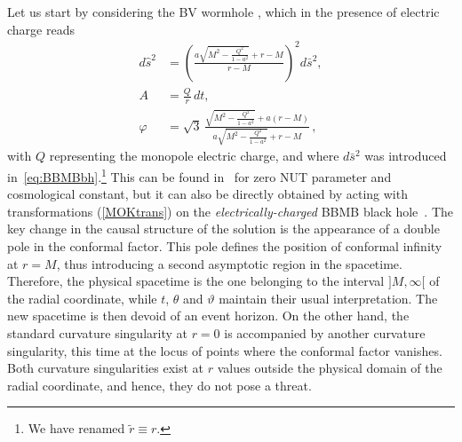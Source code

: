 \documentclass[aps,preprint,groupedaddress,nofootinbib,superscriptaddress,showkeys,showpacs,eqsecnum,amsmath,amssymb]{revtex4-1}
\begin{document}
Let us start by considering the BV wormhole \cite{Barcelo:1999hq,Barcelo:2000zf}, which in the presence of electric charge reads 
\begin{subequations}
\begin{align}
d\hat{s}^2 &= \left( \frac{a\sqrt{M^2-\frac{Q^2}{1-a^2}} + r-M}{r-M} \right)^2 d\bar{s}^2,\\
A &= \frac{Q}{r} \, dt, \\
\varphi &= \sqrt{3} \, \frac{\sqrt{M^2-\frac{Q^2}{1-a^2}} + a(r-M)}{a\sqrt{M^2-\frac{Q^2}{1-a^2}} + r-M} \,,
\end{align}
\end{subequations}
with $Q$ representing the monopole electric charge, and where $d\bar{s}^2$ was introduced in~\eqref{eq:BBMBbh}.\footnote{We have renamed $\tilde{r}\equiv r$.} This can be found in~\cite{Barrientos:2022avi} for zero NUT parameter and cosmological constant, but it can also be directly obtained by acting with transformations (\ref{MOKtrans}) on the \emph{electrically-charged} BBMB black hole~\cite{Bekenstein:1974sf}. The key change in the causal structure of the solution is the appearance of a double pole in the conformal factor. This pole defines the position of conformal infinity at $r=M$, thus introducing a second asymptotic region in the spacetime. Therefore, the physical spacetime is the one belonging to the interval $]M,\infty[$ of the radial coordinate, while $t$, $\theta$ and $\vartheta$ maintain their usual interpretation. The new spacetime is then devoid of an event horizon. On the other hand, the standard curvature singularity at $r=0$ is accompanied by another curvature singularity, this time at the locus of points where the conformal factor vanishes. Both curvature singularities exist at $r$ values outside the physical domain of the radial coordinate, and hence, they do not pose a threat.
\end{document}
